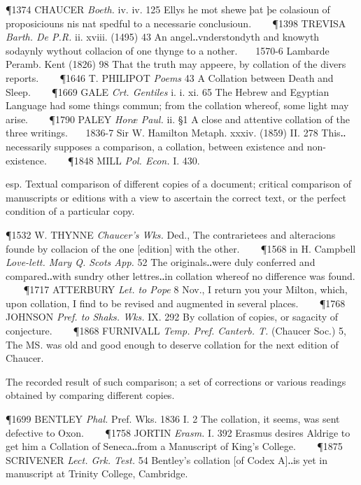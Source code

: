 \begin{description}[wide, labelwidth=!, labelindent=0pt]
\begin{myenumerate}
\P 1374 CHAUCER  \textit{Boeth.} iv. iv. 125 Ellys he mot shewe þat þe colasioun of proposiciouns nis nat spedful to a necessarie conclusioun.    
\P 1398 TREVISA  \textit{Barth. De P.R.} ii. xviii. (1495) 43 An angel‥vnderstondyth and knowyth sodaynly wythout collacion of one thynge to a nother.    1570-6 Lambarde Peramb. Kent (1826) 98 That the truth may appeere, by collation of the divers reports.    
\P 1646 T. PHILIPOT  \textit{Poems} 43 A Collation between Death and Sleep.    
\P 1669 GALE  \textit{Crt. Gentiles} i. i. xi. 65 The Hebrew and Egyptian Language had some things commun; from the collation whereof, some light may arise.    
\P 1790 PALEY  \textit{Horæ Paul.} ii. §1 A close and attentive collation of the three writings.    1836-7 Sir W. Hamilton Metaph. xxxiv. (1859) II. 278 This‥necessarily supposes a comparison, a collation, between existence and non-existence.    
\P 1848 MILL  \textit{Pol. Econ.} I. 430.

 esp. Textual comparison of different copies of a document; critical comparison of manuscripts or editions with a view to ascertain the correct text, or the perfect condition of a particular copy.

\P 1532 W. THYNNE  \textit{Chaucer's Wks.} Ded., The contrarietees and alteracions founde by collacion of the one [edition] with the other.    
\P 1568 in H. Campbell \textit{Love-lett. Mary Q. Scots App.} 52 The originals‥were duly conferred and compared‥with sundry other lettres‥in collation whereof no difference was found.    
\P 1717 ATTERBURY  \textit{Let. to Pope} 8 Nov., I return you your Milton, which, upon collation, I find to be revised and augmented in several places.    
\P 1768 JOHNSON  \textit{Pref. to Shaks. Wks.} IX. 292 By collation of copies, or sagacity of conjecture.    
\P 1868 FURNIVALL  \textit{Temp. Pref. Canterb. T.} (Chaucer Soc.) 5, The MS. was old and good enough to deserve collation for the next edition of Chaucer.

 The recorded result of such comparison; a set of corrections or various readings obtained by comparing different copies.

\P 1699 BENTLEY  \textit{Phal.} Pref. Wks. 1836 I. 2  The collation, it seems, was sent defective to Oxon.    
\P 1758 JORTIN  \textit{Erasm.} I. 392 Erasmus desires Aldrige to get him a Collation of Seneca‥from a Manuscript of King's College.    
\P 1875 SCRIVENER  \textit{Lect. Grk. Test.} 54 Bentley's collation [of Codex A]‥is yet in manuscript at Trinity College, Cambridge.


\end{myenumerate}
\end{description}
